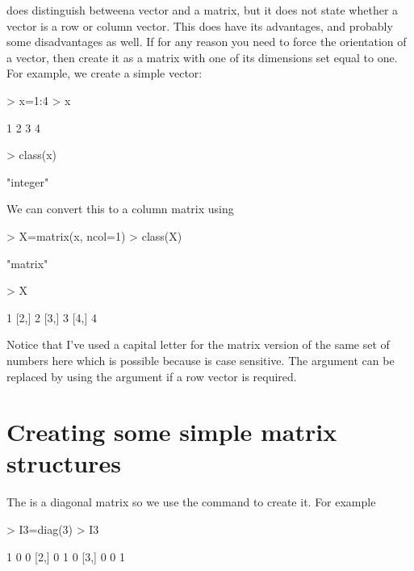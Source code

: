 \R{} does distinguish betweena vector and a matrix, but it does not state whether a vector is a row or column vector. This does have its advantages, and probably some disadvantages as well. If for any reason you need to force the orientation of a vector, then create it as a matrix with one of its dimensions set equal to one. For example, we create a simple vector:
\begin{Schunk}
\begin{Sinput}
> x=1:4
> x
\end{Sinput}
\begin{Soutput}
[1] 1 2 3 4
\end{Soutput}
\begin{Sinput}
> class(x)
\end{Sinput}
\begin{Soutput}
[1] "integer"
\end{Soutput}
\end{Schunk}
We can convert this to a column matrix using
\begin{Schunk}
\begin{Sinput}
> X=matrix(x, ncol=1)
> class(X)
\end{Sinput}
\begin{Soutput}
[1] "matrix"
\end{Soutput}
\begin{Sinput}
> X
\end{Sinput}
\begin{Soutput}
     [,1]
[1,]    1
[2,]    2
[3,]    3
[4,]    4
\end{Soutput}
\end{Schunk}
Notice that I've used a capital letter for the matrix version of the same set of numbers here which is possible because \R{} is case sensitive. The  argument can be replaced by using the  argument if a row vector is required.

\section{Creating some simple matrix structures}

The  is a diagonal matrix so we use the  command to create it. For example
\begin{Schunk}
\begin{Sinput}
> I3=diag(3)
> I3
\end{Sinput}
\begin{Soutput}
     [,1] [,2] [,3]
[1,]    1    0    0
[2,]    0    1    0
[3,]    0    0    1
\end{Soutput}
\end{Schunk}

